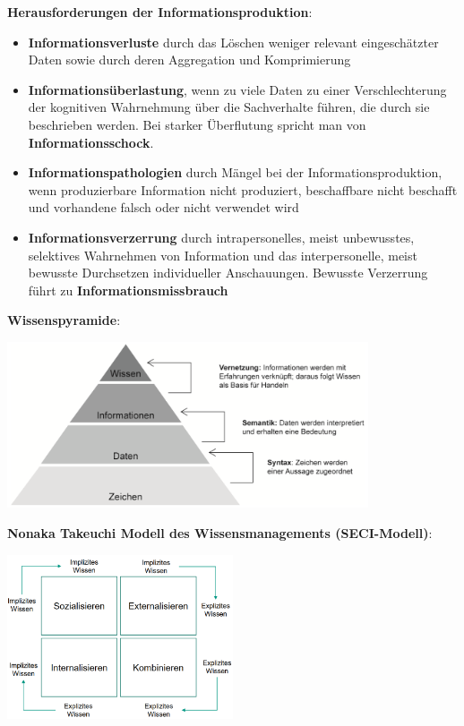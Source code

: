 \textbf{Herausforderungen der Informationsproduktion}:
\begin{itemize}
	\item \textbf{Informationsverluste} durch das Löschen weniger relevant eingeschätzter Daten sowie durch deren Aggregation und Komprimierung
	\item \textbf{Informationsüberlastung}, wenn zu viele Daten zu einer Verschlechterung der kognitiven Wahrnehmung über die Sachverhalte führen, die durch sie beschrieben werden. Bei starker Überflutung spricht man von \textbf{Informationsschock}.
	\item \textbf{Informationspathologien} durch Mängel bei der Informationsproduktion, wenn produzierbare
	Information nicht produziert, beschaffbare nicht beschafft und vorhandene falsch oder nicht verwendet wird
	\item \textbf{Informationsverzerrung} durch intrapersonelles, meist unbewusstes, selektives Wahrnehmen von Information und das interpersonelle, meist bewusste Durchsetzen individueller Anschauungen. Bewusste Verzerrung führt zu \textbf{Informationsmissbrauch}
\end{itemize}

\textbf{Wissenspyramide}: 
\begin{center}
	\includegraphics[width=0.8\textwidth]{images/wissenspyramide.png}
\end{center}

\textbf{Nonaka Takeuchi Modell des Wissensmanagements (SECI-Modell)}:
\begin{center}
	\includegraphics[width=0.5\textwidth]{images/nonaka.png}
\end{center}


